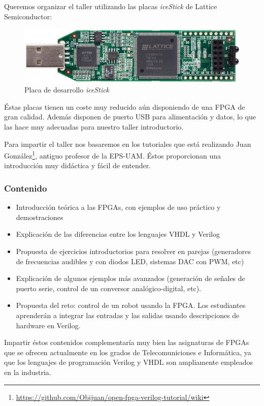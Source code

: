 \documentclass[12pt,twoside]{report}
\begin{document}
Queremos organizar el taller utilizando las placas \emph{iceStick} de Lattice Semiconductor:

\begin{figure}[hbtp]
\centerline{\includegraphics[width=0.75\linewidth]{fotos/icestick}}
\caption*{
Placa de desarrollo \emph{iceStick}
}
\end{figure}


Éstas placas tienen un coste muy reducido aún disponiendo de una FPGA de gran calidad. Además disponen de puerto USB para alimentación y datos, lo que las hace muy adecuadas para nuestro taller introductorio.

Para impartir el taller nos basaremos en los tutoriales que está realizando Juan González\footnote{\url{https://github.com/Obijuan/open-fpga-verilog-tutorial/wiki}}, antiguo profesor de la EPS-UAM. Éstos proporcionan una introducción muy didáctica y fácil de entender.

\subsubsection{Contenido}

\begin{itemize}
	\item Introducción teórica a las FPGAs, con ejemplos de uso práctico y demostraciones
	\item Explicación de las diferencias entre los lenguajes VHDL y Verilog
	\item Propuesta de ejercicios introductorios para resolver en parejas (generadores de frecuencias audibles y con diodos LED, sistemas DAC con PWM, etc)
	\item Explicación de algunos ejemplos más avanzados (generación de señales de puerto serie, control de un conversor analógico-digital, etc).
	\item Propuesta del reto: control de un robot usando la FPGA. Los estudiantes aprenderán a integrar las entradas y las salidas usando descripciones de hardware en Verilog.
\end{itemize}

Impartir éstos contenidos complementaría muy bien las asignaturas de FPGAs que se ofrecen actualmente en los grados de Telecomuniciones e Informática, ya que los lenguajes de programación Verilog y VHDL son ampliamente empleados en la industria.
\end{document}
